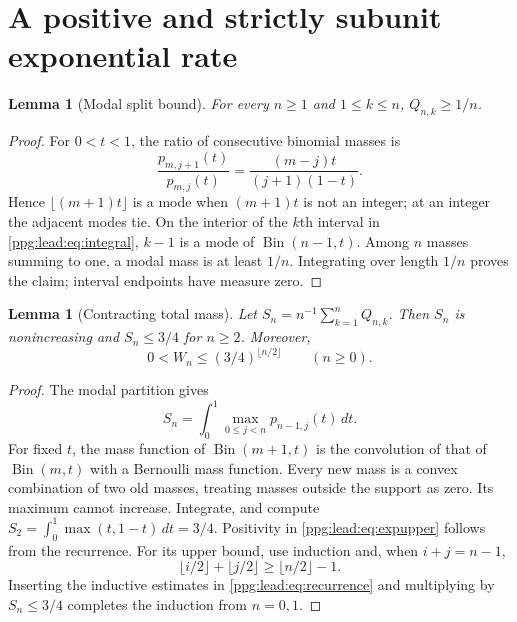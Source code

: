 \documentclass[11pt,letterpaper]{article}
\newtheorem{lemma}[theorem]{Lemma}
\theoremstyle{remark}\newtheorem{remark}[theorem]{Remark}
\numberwithin{equation}{section}
\begin{document}
\section{A positive and strictly subunit exponential rate}\label{ppg:lead:sec:rate}
\begin{lemma}[Modal split bound]\label{ppg:lead:lem:mode}
For every $n\ge1$ and $1\le k\le n$, $Q_{n,k}\ge1/n$.
\end{lemma}
\begin{proof}
For $0<t<1$, the ratio of consecutive binomial masses is
\[
 \frac{p_{m,j+1}(t)}{p_{m,j}(t)}
 =\frac{(m-j)t}{(j+1)(1-t)}.
\]
Hence $\lfloor(m+1)t\rfloor$ is a mode when $(m+1)t$ is not an integer; at an integer the adjacent modes tie. On the interior of the $k$th interval in \eqref{ppg:lead:eq:integral}, $k-1$ is a mode of $\operatorname{Bin}(n-1,t)$. Among $n$ masses summing to one, a modal mass is at least $1/n$. Integrating over length $1/n$ proves the claim; interval endpoints have measure zero.
\end{proof}

\begin{lemma}[Contracting total mass]\label{ppg:lead:lem:mass}
Let $S_n=n^{-1}\sum_{k=1}^nQ_{n,k}$. Then $S_n$ is nonincreasing and $S_n\le3/4$ for $n\ge2$. Moreover,
\begin{equation}\label{ppg:lead:eq:expupper}
 0<W_n\le(3/4)^{\lfloor n/2\rfloor}\qquad(n\ge0).
\end{equation}
\end{lemma}
\begin{proof}
The modal partition gives
\[
 S_n=\int_0^1\max_{0\le j<n}p_{n-1,j}(t)\,dt.
\]
For fixed $t$, the mass function of $\operatorname{Bin}(m+1,t)$ is the convolution of that of $\operatorname{Bin}(m,t)$ with a Bernoulli mass function. Every new mass is a convex combination of two old masses, treating masses outside the support as zero. Its maximum cannot increase. Integrate, and compute $S_2=\int_0^1\max(t,1-t)\,dt=3/4$. Positivity in \eqref{ppg:lead:eq:expupper} follows from the recurrence. For its upper bound, use induction and, when $i+j=n-1$,
\[
 \lfloor i/2\rfloor+\lfloor j/2\rfloor\ge\lfloor n/2\rfloor-1.
\]
Inserting the inductive estimates in \eqref{ppg:lead:eq:recurrence} and multiplying by $S_n\le3/4$ completes the induction from $n=0,1$.
\end{proof}
\end{document}

